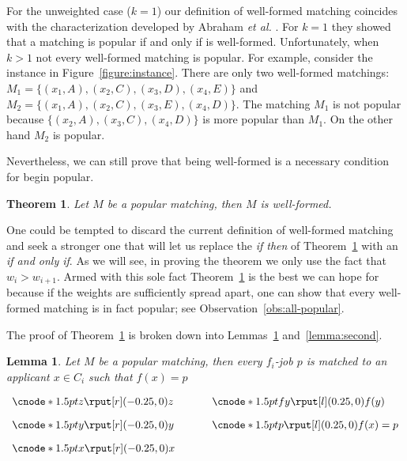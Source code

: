\documentclass[11pt]{article}
\newcommand{\first}{f}
\newcommand{\etal} {{\it et al. }}
\newtheorem{theorem}{Theorem}
\newtheorem{lemma}{Lemma}
\begin{document}
For the unweighted case ($k=1$) our definition of well-formed matching coincides with the characterization developed by Abraham \etal \cite{AIKM05}. For $k=1$ they showed that a matching is popular if and only if is well-formed. Unfortunately, when $k>1$ not every well-formed matching is popular. For example, consider the instance in Figure~\ref{figure:instance}. There are only two well-formed matchings:  $M_1 = \{ (x_1,A), (x_2,C), (x_3,D), (x_4, E)\}$ and  $M_2 = \{ (x_1,A), (x_2,C), (x_3,E), (x_4, D)\}$. The matching $M_1$ is not popular because $\{ (x_2,A), (x_3,C), (x_4,D) \}$ is more popular than $M_1$. On the other hand $M_2$ is popular.

Nevertheless, we can still prove that being well-formed is a necessary condition for begin popular.

\begin{theorem} \label{theorem:characterization}
Let $M$ be a popular matching, then $M$ is well-formed.
\end{theorem}

One could be tempted to discard the current definition of well-formed matching and seek a stronger one that will let us replace the \emph{if then} of Theorem~\ref{theorem:characterization} with an \emph{if and only if}. As we will see, in proving the theorem we only use the fact that $w_i > w_{i+1}$. Armed with this sole fact Theorem~\ref{theorem:characterization} is the best we can hope for because if the weights are sufficiently spread apart, one can show that every well-formed matching is in fact popular; see Observation~\ref{obs:all-popular}.

The proof of Theorem~\ref{theorem:characterization} is broken down into Lemmas~\ref{lemma:first} and~\ref{lemma:second}.

\begin{lemma} \label{lemma:first} Let $M$ be a popular matching, then every $\first_i$-job $p$ is matched to an applicant $x \in C_i$ such that $\first(x) = p$ 
\end{lemma}

\begin{floatingfigure}[r]{3.75cm}
\vspace{1ex}\small
\(\begin{array}{l@{\hspace{3.5em}}l}
 \cnode*{1.5pt}{z} \rput[r](-0.25,0){z}  & \cnode*{1.5pt}{fy} \rput[l](0.25,0){\first(y)} \\[0.35cm]
\cnode*{1.5pt}{y} \rput[r](-0.25,0){y}  & \cnode*{1.5pt}{p} \rput[l](0.25,0){\first(x) = p } \\[0.35cm]
\cnode*{1.5pt}{x} \rput[r](-0.25,0){x}  \\[7em]
\end{array}\)
\end{floatingfigure}
\end{document}
